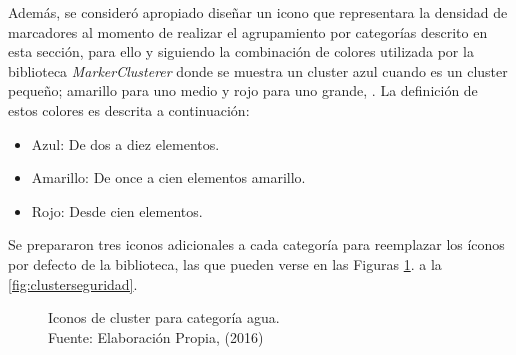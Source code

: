 Además, se consideró apropiado diseñar un icono que representara la densidad de marcadores al momento de realizar el agrupamiento por categorías descrito en esta sección, para ello y siguiendo la combinación de colores utilizada por la biblioteca \textit{MarkerClusterer} donde se muestra un cluster azul cuando es un cluster pequeño; amarillo para uno medio y rojo para uno grande, \cite{MarkerClusterer}. La definición de estos colores es descrita a continuación:

\begin{itemize}
\item Azul: De dos a diez elementos.
\item Amarillo: De once a cien elementos amarillo.
\item Rojo: Desde cien elementos.
\end{itemize}

Se prepararon tres iconos adicionales a cada categoría para reemplazar los íconos por defecto de la biblioteca, las que pueden verse en las Figuras \ref{fig:clusterAgua}. a la \ref{fig:clusterseguridad}.

\begin{figure}[H]
\centering
{}\hfill
{}\hfill
{}
\caption[Iconos de cluster para categoría agua.]{Iconos de cluster para categoría agua.\\Fuente: Elaboración Propia, (2016)}
\label{fig:clusterAgua}
\end{figure}

